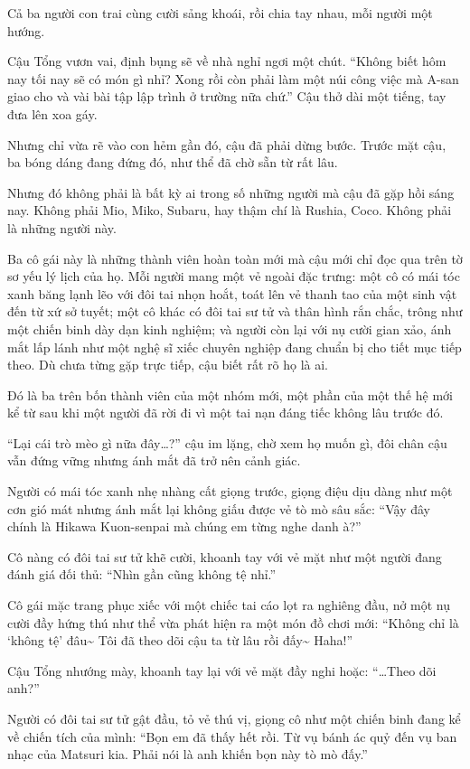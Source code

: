 \documentclass[../main.tex]{subfiles}
\begin{document}
Cả ba người con trai cùng cười sảng khoái, rồi chia tay nhau, mỗi người một hướng.

Cậu Tổng vươn vai, định bụng sẽ về nhà nghỉ ngơi một chút. ``Không biết hôm nay tối nay sẽ có món gì nhỉ? Xong rồi còn phải làm một núi công việc mà A-san giao cho và vài bài tập lập trình ở trường nữa chứ.'' Cậu thở dài một tiếng, tay đưa lên xoa gáy.

Nhưng chỉ vừa rẽ vào con hẻm gần đó, cậu đã phải dừng bước. Trước mặt cậu, ba bóng dáng đang đứng đó, như thể đã chờ sẵn từ rất lâu.

Nhưng đó không phải là bất kỳ ai trong số những người mà cậu đã gặp hồi sáng nay. Không phải Mio, Miko, Subaru, hay thậm chí là Rushia, Coco. Không phải là những người này.

Ba cô gái này là những thành viên hoàn toàn mới mà cậu mới chỉ đọc qua trên tờ sơ yếu lý lịch của họ. Mỗi người mang một vẻ ngoài đặc trưng: một cô có mái tóc xanh băng lạnh lẽo với đôi tai nhọn hoắt, toát lên vẻ thanh tao của một sinh vật đến từ xứ sở tuyết; một cô khác có đôi tai sư tử và thân hình rắn chắc, trông như một chiến binh dày dạn kinh nghiệm; và người còn lại với nụ cười gian xảo, ánh mắt lấp lánh như một nghệ sĩ xiếc chuyên nghiệp đang chuẩn bị cho tiết mục tiếp theo. Dù chưa từng gặp trực tiếp, cậu biết rất rõ họ là ai.

Đó là ba trên bốn thành viên của một nhóm mới, một phần của một thế hệ mới kể từ sau khi một người đã rời đi vì một tai nạn đáng tiếc không lâu trước đó.

``Lại cái trò mèo gì nữa đây\dots?'' cậu im lặng, chờ xem họ muốn gì, đôi chân cậu vẫn đứng vững nhưng ánh mắt đã trở nên cảnh giác.

Người có mái tóc xanh nhẹ nhàng cất giọng trước, giọng điệu dịu dàng như một cơn gió mát nhưng ánh mắt lại không giấu được vẻ tò mò sâu sắc: ``Vậy đây chính là Hikawa Kuon-senpai mà chúng em từng nghe danh à?''

Cô nàng có đôi tai sư tử khẽ cười, khoanh tay với vẻ mặt như một người đang đánh giá đối thủ: ``Nhìn gần cũng không tệ nhỉ.''

Cô gái mặc trang phục xiếc với một chiếc tai cáo lọt ra nghiêng đầu, nở một nụ cười đầy hứng thú như thể vừa phát hiện ra một món đồ chơi mới: ``Không chỉ là `không tệ' đâu\~{} Tôi đã theo dõi cậu ta từ lâu rồi đấy\~{} Haha!''

Cậu Tổng nhướng mày, khoanh tay lại với vẻ mặt đầy nghi hoặc: ``\dots Theo dõi anh?''

Người có đôi tai sư tử gật đầu, tỏ vẻ thú vị, giọng cô như một chiến binh đang kể về chiến tích của mình: ``Bọn em đã thấy hết rồi. Từ vụ bánh ác quỷ đến vụ ban nhạc của Matsuri kia. Phải nói là anh khiến bọn này tò mò đấy.''
\end{document}
